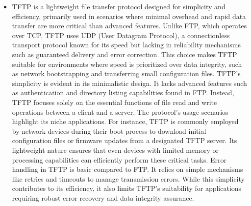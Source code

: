 \documentclass{article}
\begin{document}
\begin{itemize}
	\item[] TFTP is a lightweight file transfer protocol designed for simplicity and efficiency, primarily used in scenarios where minimal overhead and rapid data transfer are more critical than advanced features. Unlike FTP, which operates over TCP, TFTP uses UDP (User Datagram Protocol), a connectionless transport protocol known for its speed but lacking in reliability mechanisms such as guaranteed delivery and error correction. This choice makes TFTP suitable for environments where speed is prioritized over data integrity, such as network bootstrapping and transferring small configuration files. TFTP's simplicity is evident in its minimalistic design. It lacks advanced features such as authentication and directory listing capabilities found in FTP. Instead, TFTP focuses solely on the essential functions of file read and write operations between a client and a server. The protocol's usage scenarios highlight its niche applications. For instance, TFTP is commonly employed by network devices during their boot process to download initial configuration files or firmware updates from a designated TFTP server. Its lightweight nature ensures that even devices with limited memory or processing capabilities can efficiently perform these critical tasks. Error handling in TFTP is basic compared to FTP. It relies on simple mechanisms like retries and timeouts to manage transmission errors. While this simplicity contributes to its efficiency, it also limits TFTP's suitability for applications requiring robust error recovery and data integrity assurance.
\end{itemize}
\end{document}
